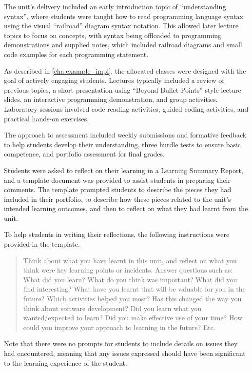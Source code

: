 The unit's delivery included an early introduction topic of ``understanding syntax'', where students were taught how to read programming language syntax using the visual ``railroad'' diagram syntax notation. This allowed later lecture topics to focus on concepts, with syntax being offloaded to programming demonstrations and supplied notes, which included railroad diagrams and small code examples for each programming statement.

As described in \cref{cha:example_impl}, the allocated classes were designed with the goal of actively engaging students. Lectures typically included a review of previous topics, a short presentation using ``Beyond Bullet Points'' style lecture slides, an interactive programming demonstration, and group activities. Laboratory sessions involved code reading activities, guided coding activities, and practical hands-on exercises.

The approach to assessment included weekly submissions and formative feedback to help students develop their understanding, three hurdle tests to ensure basic competence, and portfolio assessment for final grades.

Students were asked to reflect on their learning in a Learning Summary Report, and a template document was provided to assist students in preparing their comments. The template prompted students to describe the pieces they had included in their portfolio, to describe how these pieces related to the unit's intended learning outcomes, and then to reflect on what they had learnt from the unit.

To help students in writing their reflections, the following instructions were provided in the template. 
\begin{quote}
  \small
  Think about what you have learnt in this unit, and reflect on what you think were key learning points or incidents. Answer questions such as: What did you learn? What do you think was important? What did you find interesting? What have you learnt that will be valuable for you in the future? Which activities helped you most? Has this changed the way you think about software development? Did you learn what you wanted/expected to learn? Did you make effective use of your time? How could you improve your approach to learning in the future? Etc. 
\end{quote}

Note that there were no prompts for students to include details on issues they had encountered, meaning that any issues expressed should have been significant to the learning experience of the student.

